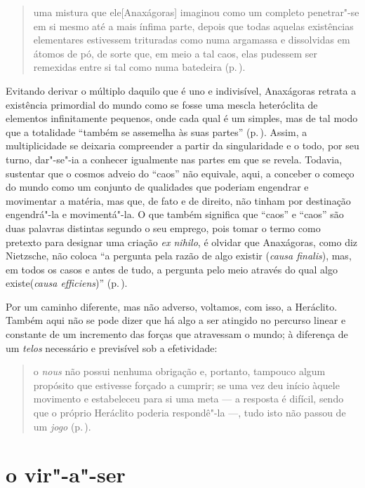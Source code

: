\begin{quote} uma mistura que ele[Anaxágoras] imaginou como um completo
 penetrar"-se em si mesmo até a mais ínfima parte, depois que todas aquelas
 existências elementares estivessem trituradas como numa argamassa e
 dissolvidas em átomos de pó, de sorte que, em meio a tal caos, elas pudessem
 ser remexidas entre si tal como numa batedeira (p.\,\pageref{mistura}).
\end{quote} 

Evitando derivar o múltiplo daquilo que é uno e indivisível, Anaxágoras
retrata a existência primordial do mundo como se fosse uma mescla heteróclita
de elementos infinitamente pequenos, onde cada qual é um simples, mas de tal
modo que a totalidade ``também se assemelha às suas partes'' (p.\,\pageref{suaspartes}). 
Assim, a multiplicidade se deixaria compreender a partir da
singularidade e o todo, por seu turno, dar"-se"-ia a conhecer igualmente nas
partes em que se revela. Todavia, sustentar que o cosmos adveio do ``caos''
não equivale, aqui, a conceber o começo do mundo como um conjunto de
qualidades que poderiam engendrar e movimentar a matéria, mas que, de fato e
de direito, não tinham por destinação engendrá"-la e movimentá"-la. O que
também significa que ``caos'' e ``caos'' são duas palavras distintas segundo
o seu emprego, pois tomar o termo como pretexto para designar uma
criação \textit{ex nihilo}, é olvidar que Anaxágoras, como diz Nietzsche, não
coloca ``a pergunta pela razão de algo existir (\textit{causa finalis}), mas,
em todos os casos e antes de tudo, a pergunta pelo meio através do qual algo
existe(\textit{causa efficiens})'' (p.\,\pageref{causafinalis}).

Por um caminho diferente, mas não adverso, voltamos, com isso, a Heráclito.
Também aqui não se pode dizer que há algo a ser atingido no percurso linear e
constante de um incremento das forças que atravessam o mundo; à diferença de
um \textit{telos} necessário e previsível sob a efetividade: 

\begin{quote} o \textit{nous} não possui nenhuma obrigação e, portanto,
 tampouco algum propósito que estivesse forçado a cumprir; se uma vez deu
 início àquele movimento e estabeleceu para si uma meta --- a resposta é
 difícil, sendo que o próprio Heráclito poderia respondê"-la ---, tudo isto
 não passou de um
\textit{jogo} (p.\,\pageref{naopossuinenhuma}).
\end{quote} 

\section{o vir"-a"-ser}

